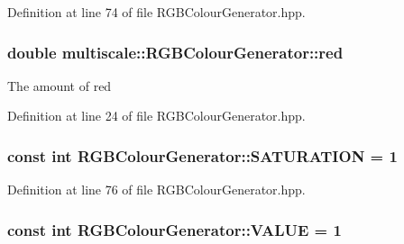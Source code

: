 Definition at line 74 of file R\-G\-B\-Colour\-Generator.\-hpp.

\hypertarget{classmultiscale_1_1RGBColourGenerator_a11da8c4a9ca59ea8c20177cbb5b57ceb}{
\subsubsection[{red}]{\setlength{\rightskip}{0pt plus 5cm}double multiscale\-::\-R\-G\-B\-Colour\-Generator\-::red\hspace{0.3cm}{\ttfamily [private]}}}\label{classmultiscale_1_1RGBColourGenerator_a11da8c4a9ca59ea8c20177cbb5b57ceb}
The amount of red 

Definition at line 24 of file R\-G\-B\-Colour\-Generator.\-hpp.

\hypertarget{classmultiscale_1_1RGBColourGenerator_a9442495dac9306e4172a27cba12788cc}{
\subsubsection[{S\-A\-T\-U\-R\-A\-T\-I\-O\-N}]{\setlength{\rightskip}{0pt plus 5cm}const int R\-G\-B\-Colour\-Generator\-::\-S\-A\-T\-U\-R\-A\-T\-I\-O\-N = 1\hspace{0.3cm}{\ttfamily [static]}}}\label{classmultiscale_1_1RGBColourGenerator_a9442495dac9306e4172a27cba12788cc}


Definition at line 76 of file R\-G\-B\-Colour\-Generator.\-hpp.

\hypertarget{classmultiscale_1_1RGBColourGenerator_a859abef56e015354d032c46680132850}{
\subsubsection[{V\-A\-L\-U\-E}]{\setlength{\rightskip}{0pt plus 5cm}const int R\-G\-B\-Colour\-Generator\-::\-V\-A\-L\-U\-E = 1\hspace{0.3cm}{\ttfamily [static]}}}\label{classmultiscale_1_1RGBColourGenerator_a859abef56e015354d032c46680132850}


